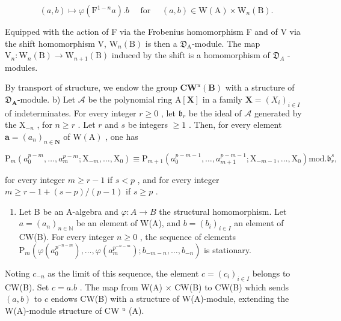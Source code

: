 \[
(a, b) \mapsto \varphi (\mathrm{F} ^ {1 - n} a). b \quad \text { for } \quad (a, b) \in \mathrm{W} (\mathrm{A}) \times \mathrm{W} _ {n} (\mathrm{B}).
\]

Equipped with the action of F via the Frobenius homomorphism F and of V via the shift homomorphism V, \(\mathrm{W}_{n}(\mathrm{B})\) is then a \(\mathfrak{D}_{\mathrm{A}}\)-module. The map \(\mathrm{V}_{n}:\mathrm{W}_{n}(\mathrm{B})\to\mathrm{W}_{n+1}(\mathrm{B})\) induced by the shift is a homomorphism of \(\mathfrak{D}_{A}\) -modules.

By transport of structure, we endow the group \(\mathbf{CW}^u (\mathbf{B})\) with a structure of \(\mathfrak{D}_{\mathbf{A}}\)-module. b) Let \(\mathcal{A}\) be the polynomial ring \(\mathrm{A}[\mathbf{X}]\) in a family \(\mathbf{X} = (X_i)_{i\in I}\) of indeterminates. For every integer \(r\geqslant 0\) , let \(\mathfrak{b}_r\) be the ideal of \(\mathcal{A}\) generated by the \(\mathrm{X}_{-n}\) , for \(n\geqslant r\) . Let \(r\) and \(s\) be integers \(\geqslant 1\) . Then, for every element \(\boldsymbol {a} = (a_n)_{n\in \mathbf{N}}\) of \(\mathrm{W(A)}\) , one has

\[
\mathrm{P} _ {m} \left(a _ {0} ^ {p - m}, \dots , a _ {m} ^ {p - m}; \mathrm{X} _ {- m}, \dots , \mathrm{X} _ {0}\right) \equiv \mathrm{P} _ {m + 1} \left(a _ {0} ^ {p - m - 1}, \dots , a _ {m + 1} ^ {p - m - 1}; \mathrm{X} _ {- m - 1}, \dots , \mathrm{X} _ {0}\right) \text {mod.} \mathfrak {b} _ {r} ^ {s},
\]

for every integer \(m \geqslant r - 1\) if \(s < p\) , and for every integer \(m \geqslant r - 1 + (s - p) / (p - 1)\) if \(s \geqslant p\) .

\begin{enumerate}
\def\labelenumi{\alph{enumi})}
\setcounter{enumi}{2}
\tightlist
\item
  Let B be an A-algebra and \(\varphi: A \to B\) the structural homomorphism. Let \(a = (a_n)_{n \in \mathbb{N}}\) be an element of W(A), and \(b = (b_i)_{i \in I}\) an element of CW(B). For every integer \(n \geqslant 0\) , the sequence of elements \(\mathrm{P}_m(\varphi(a_0^{p^{-n-m}}), \ldots, \varphi(a_m^{p^{-n-m}}); b_{-m-n}, \ldots, b_{-n})\) is stationary.
\end{enumerate}

Noting \(c_{-n}\) as the limit of this sequence, the element \(c = (c_i)_{i\in I}\) belongs to CW(B). Set \(c = a.b\) . The map from W(A) × CW(B) to CW(B) which sends \((a,b)\) to \(c\) endows CW(B) with a structure of W(A)-module, extending the W(A)-module structure of CW \(^u\) (A).

